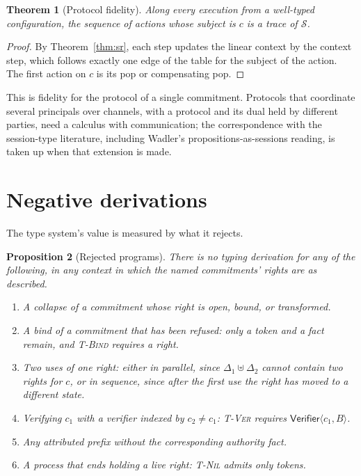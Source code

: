 \documentclass[11pt,openany]{book}
\newtheorem{theorem}{Theorem}[chapter]
\newtheorem{proposition}[theorem]{Proposition}
\theoremstyle{remark}
\begin{document}
\begin{theorem}[Protocol fidelity]\label{thm:fidelity}
Along every execution from a well-typed configuration, the sequence of
actions whose subject is $c$ is a trace of $\mathcal S$.
\end{theorem}

\begin{proof}
By Theorem~\ref{thm:sr}, each step updates the linear context by the
context step, which follows exactly one edge of the table for the subject
of the action. The first action on $c$ is its pop or compensating pop.
\end{proof}

This is fidelity for the protocol of a single commitment. Protocols that
coordinate several principals over channels, with a protocol and its dual
held by different parties, need a calculus with communication; the
correspondence with the session-type literature, including Wadler's
propositions-as-sessions reading, is taken up when that extension is made.

\section{Negative derivations}

The type system's value is measured by what it rejects.

\begin{proposition}[Rejected programs]
There is no typing derivation for any of the following, in any context in
which the named commitments' rights are as described.
\begin{enumerate}[label=(\alph*)]
\item A collapse of a commitment whose right is open, bound, or
transformed.
\item A bind of a commitment that has been refused: only a token and a
fact remain, and \textsc{T-Bind} requires a right.
\item Two uses of one right: either in parallel, since
$\Delta_1\uplus\Delta_2$ cannot contain two rights for $c$, or in sequence,
since after the first use the right has moved to a different state.
\item Verifying $c_1$ with a verifier indexed by $c_2\neq c_1$:
\textsc{T-Ver} requires $\mathsf{Verifier}\langle c_1,B\rangle$.
\item Any attributed prefix without the corresponding authority fact.
\item A process that ends holding a live right: \textsc{T-Nil} admits only
tokens.
\end{enumerate}
\end{proposition}
\end{document}
